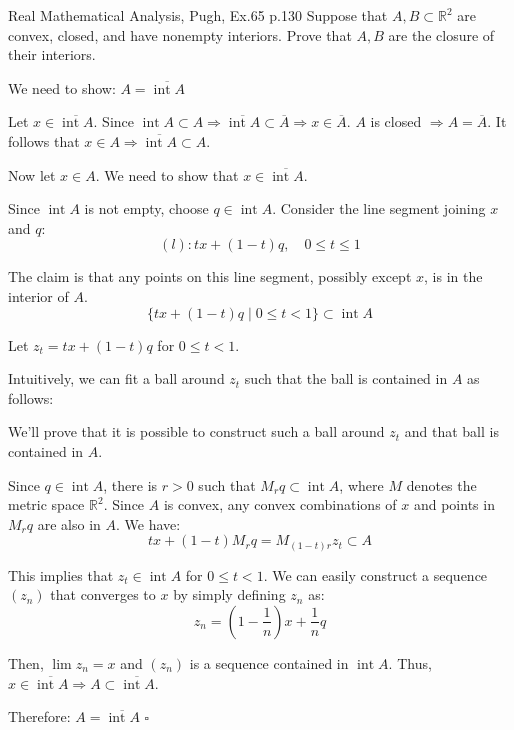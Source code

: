\begin{problem}{}{}{Real Mathematical Analysis, Pugh, Ex.65 p.130}
Suppose that $A, B \subset \mathbb{R}^2$ are convex, closed, and have nonempty interiors.
Prove that $A, B$ are the closure of their interiors.
\end{problem}

\begin{solution}

    We need to show: $A = \overline{\operatorname{int} A}$

    Let $x \in \overline{\operatorname{int} A}$. Since $\operatorname{int} A \subset A
        \Rightarrow \overline{\operatorname{int} A} \subset \overline{A} \Rightarrow x \in \overline{A}$.
    $A$ is closed $\Rightarrow A = \overline{A}$. It follows that $x \in A \Rightarrow \overline{\operatorname{int} A} \subset A$.

    Now let $x \in A$. We need to show that $x \in \overline{\operatorname{int} A}$.

    Since $\operatorname{int} A$ is not empty, choose $q \in \operatorname{int} A$. Consider the line segment joining $x$ and $q$:
    \[ (l): tx + (1-t)q, \quad 0 \le t \le 1 \]

    The claim is that any points on this line segment, possibly except $x$, is in the interior of $A$.
    \[ \{tx + (1-t)q \mid 0 \le t < 1\} \subset \operatorname{int} A \]

    Let $z_t = tx + (1-t)q$ for $0 \le t < 1$.

    Intuitively, we can fit a ball around $z_t$ such that the ball is contained in $A$ as follows:

    We'll prove that it is possible to construct such a ball around $z_t$ and that ball is contained in $A$.

    Since $q \in \operatorname{int} A$, there is $r > 0$ such that $M_r q \subset \operatorname{int} A$,
    where $M$ denotes the metric space $\mathbb{R}^2$. Since $A$ is convex, any convex combinations of $x$ and points in $M_r q$ are also in $A$. We have:
    \[ tx + (1-t)M_r q = M_{(1-t)r} z_t \subset A \]

    This implies that $z_t \in \operatorname{int} A$ for $0 \le t < 1$. We can easily construct a sequence $(z_n)$ that converges
    to $x$ by simply defining $z_n$ as:
    \[ z_n = \left(1-\frac{1}{n}\right)x + \frac{1}{n}q \]

    Then, $\lim z_n = x$ and $(z_n)$ is a sequence contained in $\operatorname{int} A$. Thus, $x \in \overline{\operatorname{int} A} \Rightarrow A \subset \overline{\operatorname{int} A}$.

    Therefore: $A = \overline{\operatorname{int} A}$
    \hfill $\square$ 

\end{solution}